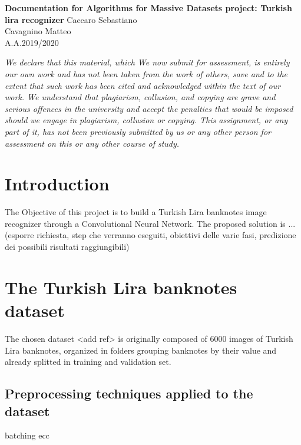 \documentclass[a4paper,12pt]{article}
\begin{document}
\begin{titlepage}
\begin{center}
	\Large{\textbf{Documentation for Algorithms for Massive Datasets project: Turkish lira recognizer}}
\vfill
\normalsize{Caccaro Sebastiano}\\
\normalsize{Cavagnino Matteo}\\
\normalsize{A.A.2019/2020}
\end{center}
\end{titlepage}

\vspace*{\fill}
\textit{We declare that this material, which We now submit for assessment, is entirely our own work and has not been taken from the work of others, save and to the extent that such work has been cited and acknowledged within the text of our work. We understand that plagiarism, collusion, and copying are grave and serious offences in the university and accept the penalties that would be imposed should we engage in plagiarism, collusion or copying. This assignment, or any part of it, has not been previously submitted by us or any other person for assessment on this or any other course of study.}
\vspace*{\fill}

\newpage

\tableofcontents

\clearpage


\newpage
\section{Introduction}
The Objective of this project is to build a Turkish Lira banknotes image recognizer through a Convolutional Neural Network.
The proposed solution is ... (esporre richiesta, step che verranno eseguiti, obiettivi delle varie fasi, predizione dei possibili risultati raggiungibili)

\newpage
\section{The Turkish Lira banknotes dataset}
The chosen dataset <add ref> is originally composed of 6000 images of Turkish Lira banknotes, organized in folders grouping banknotes by their value and already splitted in training and validation set.

\newpage
\subsection{Preprocessing techniques applied to the dataset}
batching ecc
\end{document}
